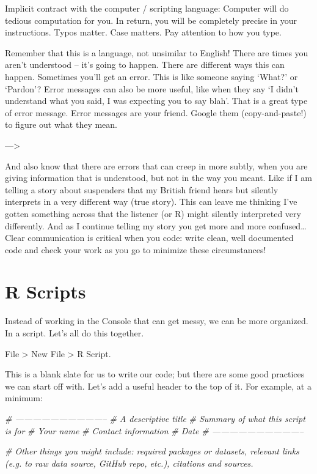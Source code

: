\documentclass[]{book}
\newenvironment{Shaded}{\begin{snugshade}}{\end{snugshade}}
\newcommand{\CommentTok}[1]{\textcolor[rgb]{0.56,0.35,0.01}{\textit{#1}}}
\begin{document}
Implicit contract with the computer / scripting language: Computer will do tedious computation for you. In return, you will be completely precise in your instructions. Typos matter. Case matters. Pay attention to how you type.

Remember that this is a language, not unsimilar to English! There are times you aren't understood -- it's going to happen. There are different ways this can happen. Sometimes you'll get an error. This is like someone saying `What?' or `Pardon'? Error messages can also be more useful, like when they say `I didn't understand what you said, I was expecting you to say blah'. That is a great type of error message. Error messages are your friend. Google them (copy-and-paste!) to figure out what they mean.

---\textgreater{}

And also know that there are errors that can creep in more subtly, when you are giving information that is understood, but not in the way you meant. Like if I am telling a story about suspenders that my British friend hears but silently interprets in a very different way (true story). This can leave me thinking I've gotten something across that the listener (or R) might silently interpreted very differently. And as I continue telling my story you get more and more confused\ldots{} Clear communication is critical when you code: write clean, well documented code and check your work as you go to minimize these circumstances!

\hypertarget{r-scripts}{%
\section{R Scripts}\label{r-scripts}}

Instead of working in the Console that can get messy, we can be more organized. In a script. Let's all do this together.

File \textgreater{} New File \textgreater{} R Script.

This is a blank slate for us to write our code; but there are some good practices we can start off with. Let's add a useful header to the top of it. For example, at a minimum:

\begin{Shaded}
\begin{Highlighting}[]
\CommentTok{# --------------------------------}
\CommentTok{# A descriptive title}
\CommentTok{# Summary of what this script is for }
\CommentTok{# Your name}
\CommentTok{# Contact information}
\CommentTok{# Date}
\CommentTok{# --------------------------------}

\CommentTok{# Other things you might include: required packages or datasets, relevant links (e.g. to raw data source, GitHub repo, etc.), citations and sources.}
\end{Highlighting}
\end{Shaded}
\end{document}

